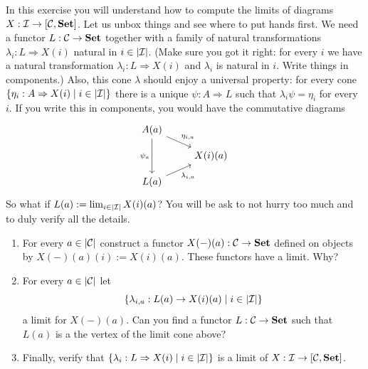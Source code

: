 \begin{exercise} %
  In this exercise you will understand how to compute the limits of
  diagrams \(X : \mathcal{I} \to [\mathcal{C}, \mathbf{Set}]\). Let us unbox
  things and see where to put hands first. We need a functor \(L :
  \mathcal{C} \to \mathbf{Set}\) together with a family of natural
  transformations \(\lambda_i : L \Rightarrow X(i)\) natural in \(i \in \left\lvert\mathcal{I}\right\rvert\). (Make
  sure you got it right: for every \(i\) we have a natural
  transformation \(\lambda_i : L \Rightarrow X(i)\) and \(\lambda_i\) is natural in
  \(i\). Write things in components.) Also, this cone \(\lambda\) should enjoy a
  universal property: for every cone \(\left\{ \eta_i : A \Rightarrow X(i) \mid i \in
    \left\lvert\mathcal{I}\right\rvert \right\}\) there is a unique \(\psi : A \Rightarrow L\) such that \(\lambda_i \psi
  = \eta_i\) for every \(i\). If you write this in components, you would
  have the commutative diagrams
  \[
    \begin{tikzcd}[row sep=small]
      A(a) \ar["{\psi_a}", dd, swap] \ar["{\eta_{i,a}}", dr] \\
      & X(i)(a) \\
      L(a) \ar["{\lambda_{i, a}}", ur, swap]
    \end{tikzcd}
  \]
  So what if \(L(a) := \lim_{i \in \left\lvert\mathcal{I}\right\rvert} X(i)(a)\)? You will be ask to
  not hurry too much and to duly verify all the details.
  \begin{enumerate}
  \item For every \(a \in \left\lvert\mathcal{C}\right\rvert\) construct a functor \(X(-)(a) :
    \mathcal{C} \to \mathbf{Set}\) defined on objects by \(X(-)(a) (i) := X(i)(a)\). These
    functors have a limit. Why?
  \item For every \(a \in \left\lvert\mathcal{C}\right\rvert\) let
    \[
      \left\{ \lambda_{i, a} : L(a) \to X(i)(a) \mid i \in \left\lvert\mathcal{I}\right\rvert \right\}
    \]
    a limit for \(X(-)(a)\). Can you find a functor \(L : \mathcal{C} \to \mathbf{Set}\)
    such that \(L(a)\) is a the vertex of the limit cone above?
  \item Finally, verify that \(\left\{ \lambda_i : L \Rightarrow X(i) \mid i \in \left\lvert\mathcal{I}\right\rvert
    \right\}\) is a limit of \(X : \mathcal{I} \to [\mathcal{C}, \mathbf{Set}]\).
  \end{enumerate}
\end{exercise}


